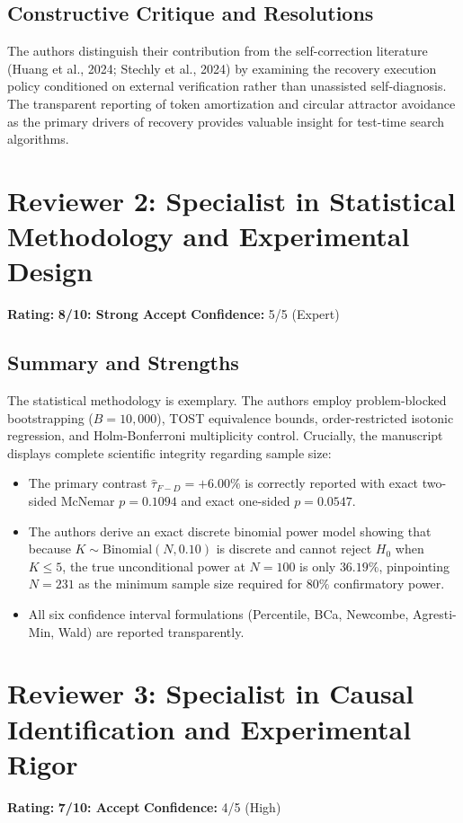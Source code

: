 \documentclass[11pt]{article}
\begin{document}
\subsection*{Constructive Critique and Resolutions}
The authors distinguish their contribution from the self-correction literature (Huang et al., 2024; Stechly et al., 2024) by examining the recovery execution policy conditioned on external verification rather than unassisted self-diagnosis. The transparent reporting of token amortization and circular attractor avoidance as the primary drivers of recovery provides valuable insight for test-time search algorithms.

\section*{Reviewer 2: Specialist in Statistical Methodology and Experimental Design}
\textbf{Rating:} \textbf{8/10: Strong Accept} \quad \textbf{Confidence:} 5/5 (Expert)

\subsection*{Summary and Strengths}
The statistical methodology is exemplary. The authors employ problem-blocked bootstrapping ($B = 10,000$), TOST equivalence bounds, order-restricted isotonic regression, and Holm-Bonferroni multiplicity control. Crucially, the manuscript displays complete scientific integrity regarding sample size:
\begin{itemize}
    \item The primary contrast $\hat{\tau}_{F-D} = +6.00\%$ is correctly reported with exact two-sided McNemar $p = 0.1094$ and exact one-sided $p = 0.0547$.
    \item The authors derive an exact discrete binomial power model showing that because $K \sim \text{Binomial}(N, 0.10)$ is discrete and cannot reject $H_0$ when $K \le 5$, the true unconditional power at $N=100$ is only $36.19\%$, pinpointing $N=231$ as the minimum sample size required for $80\%$ confirmatory power.
    \item All six confidence interval formulations (Percentile, BCa, Newcombe, Agresti-Min, Wald) are reported transparently.
\end{itemize}

\section*{Reviewer 3: Specialist in Causal Identification and Experimental Rigor}
\textbf{Rating:} \textbf{7/10: Accept} \quad \textbf{Confidence:} 4/5 (High)
\end{document}
